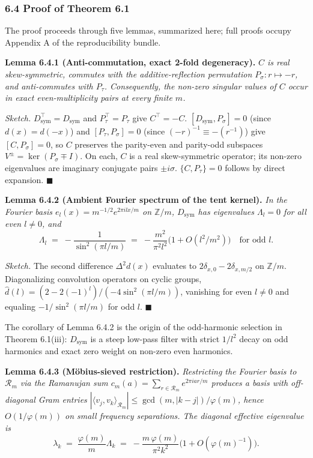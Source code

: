 \documentclass[
  11pt,
]{article}
\begin{document}
\subsubsection{6.4 Proof of Theorem 6.1}\label{proof-of-theorem-6.1}

The proof proceeds through five lemmas, summarized here; full proofs
occupy Appendix A of the reproducibility bundle.

\textbf{Lemma 6.4.1 (Anti-commutation, exact 2-fold degeneracy).}
\emph{\(C\) is real skew-symmetric, commutes with the
additive-reflection permutation \(P_\sigma : r \mapsto -r\), and
anti-commutes with \(P_\tau\). Consequently, the non-zero singular
values of \(C\) occur in exact even-multiplicity pairs at every finite
\(m\).}

\emph{Sketch.} \(D_\text{sym}^\top = D_\text{sym}\) and
\(P_\tau^\top = P_\tau\) give \(C^\top = -C\).
\([D_\text{sym}, P_\sigma] = 0\) (since \(d(x) = d(-x)\)) and
\([P_\tau, P_\sigma] = 0\) (since \((-r)^{-1} \equiv -(r^{-1})\)) give
\([C, P_\sigma] = 0\), so \(C\) preserves the parity-even and parity-odd
subspaces \(V^\pm = \ker(P_\sigma \mp I)\). On each, \(C\) is a real
skew-symmetric operator; its non-zero eigenvalues are imaginary
conjugate pairs \(\pm i \sigma\). \(\{C, P_\tau\} = 0\) follows by
direct expansion. \(\blacksquare\)

\textbf{Lemma 6.4.2 (Ambient Fourier spectrum of the tent kernel).}
\emph{In the Fourier basis \(e_l(x) = m^{-1/2} e^{2\pi i l x/m}\) on
\(\mathbb{Z}/m\), \(D_\text{sym}\) has eigenvalues \(\Lambda_l = 0\) for
all even \(l \neq 0\), and}
\[\Lambda_l \;=\; -\frac{1}{\sin^2(\pi l/m)} \;=\; -\frac{m^2}{\pi^2 l^2}\bigl(1 + O(l^2/m^2)\bigr) \quad \text{for odd } l. \tag{6.6}\]

\emph{Sketch.} The second difference \(\Delta^2 d(x)\) evaluates to
\(2\delta_{x,0} - 2\delta_{x, m/2}\) on \(\mathbb{Z}/m\). Diagonalizing
convolution operators on cyclic groups,
\(\hat d(l) = (2 - 2(-1)^l) / (-4\sin^2(\pi l/m))\), vanishing for even
\(l \neq 0\) and equaling \(-1/\sin^2(\pi l/m)\) for odd \(l\).
\(\blacksquare\)

The corollary of Lemma 6.4.2 is the origin of the odd-harmonic selection
in Theorem 6.1(iii): \(D_\text{sym}\) is a steep low-pass filter with
strict \(1/l^2\) decay on odd harmonics and exact zero weight on
non-zero even harmonics.

\textbf{Lemma 6.4.3 (Möbius-sieved restriction).} \emph{Restricting the
Fourier basis to \(\mathcal{R}_m\) via the Ramanujan sum
\(c_m(a) = \sum_{r \in \mathcal{R}_m} e^{2\pi i a r/m}\) produces a
basis with off-diagonal Gram entries
\(|\langle v_j, v_k \rangle_{\mathcal{R}_m}| \leq \gcd(m, |k-j|)/\varphi(m)\),
hence \(O(1/\varphi(m))\) on small frequency separations. The diagonal
effective eigenvalue is}
\[\lambda_k \;=\; \frac{\varphi(m)}{m} \Lambda_k \;=\; -\frac{m\,\varphi(m)}{\pi^2 k^2}\bigl(1 + O(\varphi(m)^{-1})\bigr). \tag{6.7}\]
\end{document}
